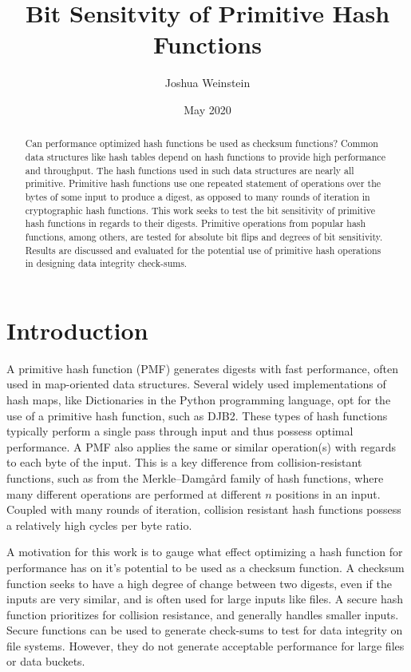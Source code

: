 \documentclass{article}
\title{Bit Sensitvity of Primitive Hash Functions}
\author{Joshua Weinstein}
\affil{Splunk Inc}
\date{May 2020}
\begin{document}
\maketitle

\begin{abstract}
Can performance optimized hash functions be used as checksum functions? Common data structures like hash tables depend on hash functions to provide high performance and throughput. The hash functions used in such data structures are nearly all primitive. Primitive hash functions use one repeated statement of operations over the bytes of some input to produce a digest, as opposed to many rounds of iteration in cryptographic hash functions. This work seeks to test the bit sensitivity of primitive hash functions in regards to their digests. Primitive operations from popular hash functions, among others, are tested for absolute bit flips and degrees of bit sensitivity. Results are discussed and evaluated for the potential use of primitive hash operations in designing data integrity check-sums. 
\end{abstract}

\section{Introduction}
A primitive hash function (PMF) generates digests with fast performance, often used in map-oriented data structures. Several widely used implementations of hash maps, like Dictionaries\citep{PythonDJB2} in the Python programming language, opt for the use of a primitive hash function, such as DJB2. These types of hash functions typically perform a single pass through input and thus possess optimal performance. A PMF also applies the same or similar operation(s) with regards to each byte of the input. This is a key difference from collision-resistant functions, such as from the Merkle–Damgård family of hash functions, where many different operations are performed at different $n$ positions in an input. Coupled with many rounds of iteration, collision resistant hash functions possess a relatively high cycles per byte ratio\citep{menasce2003security}. 

A motivation for this work is to gauge what effect optimizing a hash function for performance has on it's potential to be used as a checksum function. A checksum function seeks to have a high degree of change between two digests, even if the inputs are very similar, and is often used for large inputs like files. A secure hash function prioritizes for collision resistance, and generally handles smaller inputs. Secure functions can be used to generate check-sums to test for data integrity on file systems\citep{sivathanu2004enhancing}. However, they do not generate acceptable performance for large files or data buckets.
\end{document}
